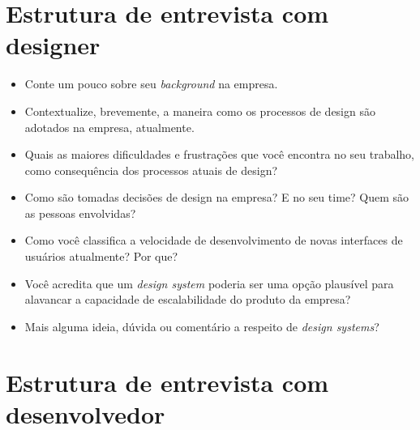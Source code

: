 
\begin{anexosenv}
\partanexos


\chapter{Estrutura de entrevista com designer}
\label{chap:anexoA}

\begin{itemize}
  \item Conte um pouco sobre seu \textit{background} na empresa.
  \item Contextualize, brevemente, a maneira como os processos de design são adotados na empresa, atualmente.
  \item Quais as maiores dificuldades e frustrações que você encontra no seu trabalho, como consequência dos processos atuais de design?
  \item Como são tomadas decisões de design na empresa? E no seu time? Quem são as pessoas envolvidas?
  \item Como você classifica a velocidade de desenvolvimento de novas interfaces de usuários atualmente? Por que?
  \item Você acredita que um \textit{design system} poderia ser uma opção plausível para alavancar a capacidade de escalabilidade do produto da empresa?
  \item Mais alguma ideia, dúvida ou comentário a respeito de \textit{design systems}?
\end{itemize}


\chapter{Estrutura de entrevista com desenvolvedor}
\label{chap:anexoB}


\end{anexosenv}
